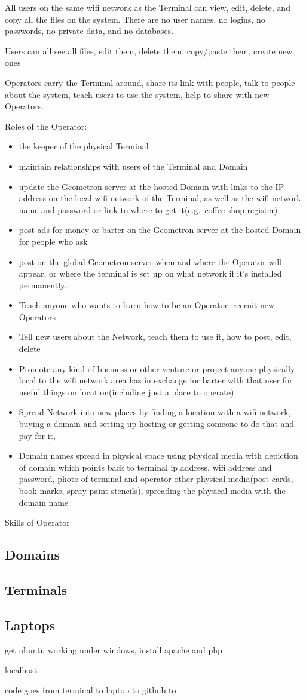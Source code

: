 All users on the same wifi network as the Terminal can view, edit,
delete, and copy all the files on the system. There are no user names,
no logins, no passwords, no private data, and no databases.

Users can all see all files, edit them, delete them, copy/paste them,
create new ones

Operators carry the Terminal around, share its link with people, talk to
people about the system, teach users to use the system, help to share
with new Operators.

Roles of the Operator:

\begin{itemize}
\tightlist
\item
  the keeper of the physical Terminal
\item
  maintain relationships with users of the Terminal and Domain
\item
  update the Geometron server at the hosted Domain with links to the IP
  address on the local wifi network of the Terminal, as well as the wifi
  network name and password or link to where to get it(e.g.~coffee shop
  register)
\item
  post ads for money or barter on the Geometron server at the hosted
  Domain for people who ask
\item
  post on the global Geometron server when and where the Operator will
  appear, or where the terminal is set up on what network if it's
  installed permanently.
\item
  Teach anyone who wants to learn how to be an Operator, recruit new
  Operators
\item
  Tell new users about the Network, teach them to use it, how to post,
  edit, delete
\item
  Promote any kind of business or other venture or project anyone
  physically local to the wifi network area has in exchange for barter
  with that user for useful things on location(including just a place to
  operate)
\item
  Spread Network into new places by finding a location with a wifi
  network, buying a domain and setting up hosting or getting someone to
  do that and pay for it,
\item
  Domain names spread in physical space using physical media with
  depiction of domain which points back to terminal ip address, wifi
  address and password, photo of terminal and operator other physical
  media(post cards, book marks, spray paint stencils), spreading the
  physical media with the domain name
\end{itemize}

Skills of Operator

\subsection{Domains}\label{domains}

\subsection{Terminals}\label{terminals}

\subsection{Laptops}\label{laptops}

get ubuntu working under windows, install apache and php

localhost

code goes from terminal to laptop to github to
